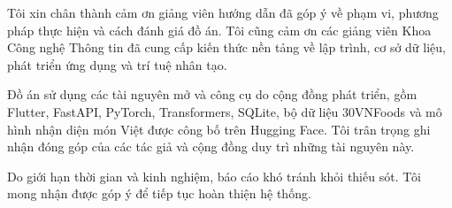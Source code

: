 \begin{acknowledgments}

Tôi xin chân thành cảm ơn giảng viên hướng dẫn đã góp ý về phạm vi, phương
pháp thực hiện và cách đánh giá đồ án. Tôi cũng cảm ơn các giảng viên Khoa
Công nghệ Thông tin đã cung cấp kiến thức nền tảng về lập trình, cơ sở dữ
liệu, phát triển ứng dụng và trí tuệ nhân tạo.

Đồ án sử dụng các tài nguyên mở và công cụ do cộng đồng phát triển, gồm
Flutter, FastAPI, PyTorch, Transformers, SQLite, bộ dữ liệu 30VNFoods và mô
hình nhận diện món Việt được công bố trên Hugging Face. Tôi trân trọng ghi
nhận đóng góp của các tác giả và cộng đồng duy trì những tài nguyên này.

Do giới hạn thời gian và kinh nghiệm, báo cáo khó tránh khỏi thiếu sót. Tôi
mong nhận được góp ý để tiếp tục hoàn thiện hệ thống.

\vspace{2cm}
\begin{flushright}
\textbf{\dauSinhVien}
\end{flushright}

\end{acknowledgments}
